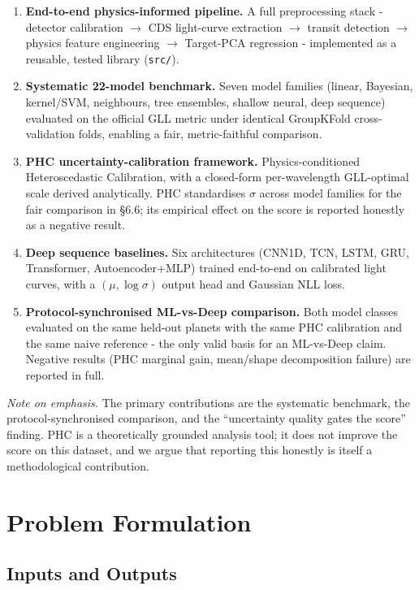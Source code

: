 \documentclass[12pt]{article}
\begin{document}
\begin{enumerate}
\item \textbf{End-to-end physics-informed pipeline.} A full preprocessing stack - detector calibration $\rightarrow$ CDS light-curve extraction $\rightarrow$ transit detection $\rightarrow$ physics feature engineering $\rightarrow$ Target-PCA regression - implemented as a reusable, tested library (\texttt{src/}).

\item \textbf{Systematic 22-model benchmark.} Seven model families (linear, Bayesian, kernel/SVM, neighbours, tree ensembles, shallow neural, deep sequence) evaluated on the official GLL metric under identical GroupKFold cross-validation folds, enabling a fair, metric-faithful comparison.

\item \textbf{PHC uncertainty-calibration framework.} Physics-conditioned Heteroscedastic Calibration, with a closed-form per-wavelength GLL-optimal scale derived analytically. PHC standardises $\sigma$ across model families for the fair comparison in \S6.6; its empirical effect on the score is reported honestly as a negative result.

\item \textbf{Deep sequence baselines.} Six architectures (CNN1D, TCN, LSTM, GRU, Transformer, Autoencoder+MLP) trained end-to-end on calibrated light curves, with a $(\mu, \log\sigma)$ output head and Gaussian NLL loss.

\item \textbf{Protocol-synchronised ML-vs-Deep comparison.} Both model classes evaluated on the same held-out planets with the same PHC calibration and the same naive reference - the only valid basis for an ML-vs-Deep claim. Negative results (PHC marginal gain, mean/shape decomposition failure) are reported in full.
\end{enumerate}

\textit{Note on emphasis.} The primary contributions are the systematic benchmark, the protocol-synchronised comparison, and the ``uncertainty quality gates the score'' finding. PHC is a theoretically grounded analysis tool; it does not improve the score on this dataset, and we argue that reporting this honestly is itself a methodological contribution.
\section{Problem Formulation}

\subsection{Inputs and Outputs}
\end{document}
